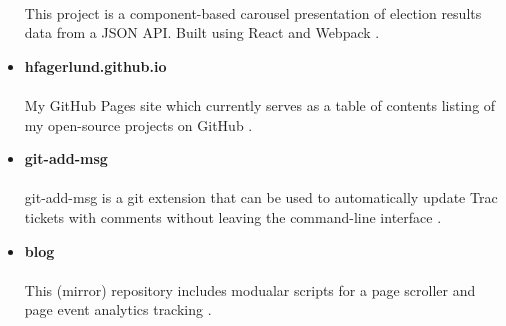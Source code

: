 \documentclass[11pt]{article}
\begin{document}
\begin{itemize}
   \paragraph{}
   This project is a component-based carousel presentation of election results data from a JSON API. Built using React and Webpack \cite{elections-carousel-component}.
\item \textbf{hfagerlund.github.io}
   \paragraph{}
   My GitHub Pages site which currently serves as a table of contents listing of my open-source projects on GitHub \cite{ghpages}.
\item \textbf{git-add-msg}
   \paragraph{}
   git-add-msg is a git extension that can be used to automatically update Trac tickets with comments without leaving the command-line interface \cite{git-add-msg}.
\item \textbf{blog}
   \paragraph{}
   This (mirror) repository includes modualar scripts for a page scroller and page event analytics tracking \cite{blog}.
\end{itemize}

\begin{sloppypar}


\end{sloppypar}
\end{document}
